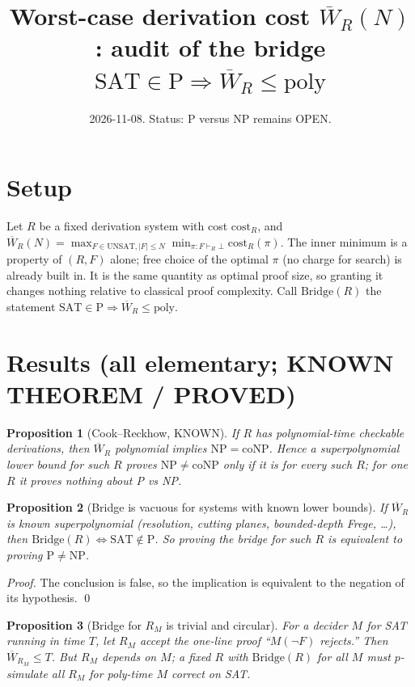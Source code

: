 \documentclass{article}
\newtheorem{prop}{Proposition}
\begin{document}
\title{Worst-case derivation cost $\overline W_R(N)$: audit of the bridge $\mathrm{SAT}\in\mathrm P\Rightarrow \overline W_R\le\mathrm{poly}$}
\date{2026-11-08. Status: P versus NP remains OPEN.}
\maketitle

\section*{Setup}
Let $R$ be a fixed derivation system with cost $\mathrm{cost}_R$, and
$\overline W_R(N)=\max_{F\in\mathrm{UNSAT},|F|\le N}\min_{\pi:F\vdash_R\bot}\mathrm{cost}_R(\pi)$.
The inner minimum is a property of $(R,F)$ alone; free choice of the optimal $\pi$ (no charge for search) is already built in. It is the same quantity as optimal proof size, so granting it changes nothing relative to classical proof complexity.
Call $\mathrm{Bridge}(R)$ the statement $\mathrm{SAT}\in\mathrm P\Rightarrow\overline W_R\le\mathrm{poly}$.

\section*{Results (all elementary; KNOWN THEOREM / PROVED)}
\begin{prop}[Cook--Reckhow, KNOWN]
If $R$ has polynomial-time checkable derivations, then $\overline W_R$ polynomial implies $\mathrm{NP}=\mathrm{coNP}$. Hence a superpolynomial lower bound for such $R$ proves $\mathrm{NP}\ne\mathrm{coNP}$ only if it is for \emph{every} such $R$; for one $R$ it proves nothing about P vs NP.
\end{prop}

\begin{prop}[Bridge is vacuous for systems with known lower bounds]
If $\overline W_R$ is known superpolynomial (resolution, cutting planes, bounded-depth Frege, \dots), then $\mathrm{Bridge}(R)\iff \mathrm{SAT}\notin\mathrm P$. So proving the bridge for such $R$ is equivalent to proving $\mathrm P\neq\mathrm{NP}$.
\end{prop}
\emph{Proof.} The conclusion is false, so the implication is equivalent to the negation of its hypothesis. \qed

\begin{prop}[Bridge for $R_M$ is trivial and circular]
For a decider $M$ for SAT running in time $T$, let $R_M$ accept the one-line proof ``$M(\neg F)$ rejects.'' Then $\overline W_{R_M}\le T$. But $R_M$ depends on $M$; a fixed $R$ with $\mathrm{Bridge}(R)$ for all $M$ must $p$-simulate all $R_M$ for poly-time $M$ correct on SAT.
\end{prop}
\end{document}
